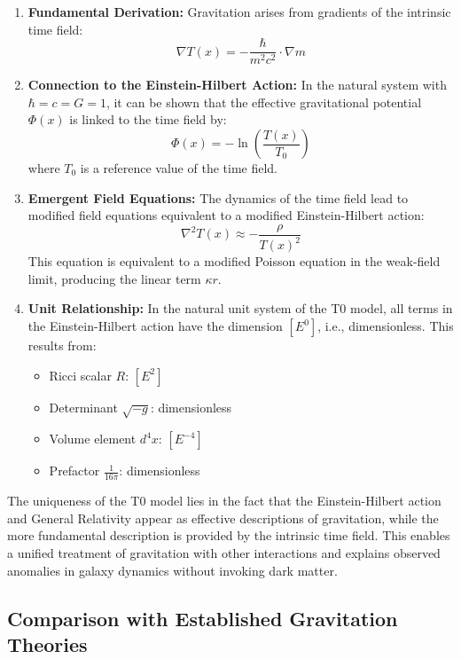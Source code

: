 \documentclass[12pt,a4paper]{article}
\begin{document}
	\begin{enumerate}
		\item \textbf{Fundamental Derivation:} Gravitation arises from gradients of the intrinsic time field:
		\[
		\nabla T(x) = -\frac{\hbar}{m^2c^2} \cdot \nabla m
		\]
		
		\item \textbf{Connection to the Einstein-Hilbert Action:} In the natural system with $\hbar = c = G = 1$, it can be shown that the effective gravitational potential $\Phi(x)$ is linked to the time field by:
		\[
		\Phi(x) = -\ln\left(\frac{T(x)}{T_0}\right)
		\]
		where $T_0$ is a reference value of the time field.
		
		\item \textbf{Emergent Field Equations:} The dynamics of the time field lead to modified field equations equivalent to a modified Einstein-Hilbert action:
		\[
		\nabla^2T(x) \approx -\frac{\rho}{T(x)^2}
		\]
		This equation is equivalent to a modified Poisson equation in the weak-field limit, producing the linear term $\kappa r$.
		
		\item \textbf{Unit Relationship:} In the natural unit system of the T0 model, all terms in the Einstein-Hilbert action have the dimension $[E^0]$, i.e., dimensionless. This results from:
		\begin{itemize}
			\item Ricci scalar $R$: $[E^2]$
			\item Determinant $\sqrt{-g}$: dimensionless
			\item Volume element $d^4x$: $[E^{-4}]$
			\item Prefactor $\frac{1}{16\pi}$: dimensionless
		\end{itemize}
	\end{enumerate}
	
	The uniqueness of the T0 model lies in the fact that the Einstein-Hilbert action and General Relativity appear as effective descriptions of gravitation, while the more fundamental description is provided by the intrinsic time field. This enables a unified treatment of gravitation with other interactions and explains observed anomalies in galaxy dynamics without invoking dark matter.
	
	\subsection*{Comparison with Established Gravitation Theories}
	
\end{document}
